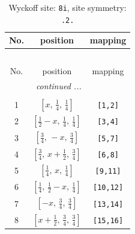 \documentclass[fleqn,8pt]{jsarticle}
\begin{document}
\begin{longtable}{ccc}
\caption{Wyckoff site: {\tt 8i}, site symmetry: {\tt .2.}}
 \\
 \hline \hline
No. & position & mapping \\ \hline \endfirsthead

\multicolumn{2}{l}{\tablename\ \thetable{}} \\
 \hline \hline
No. & position & mapping \\ \hline \endhead

 \hline \hline
\multicolumn{2}{r}{\footnotesize\it continued ...} \\ \endfoot

 \hline \hline
\multicolumn{2}{r}{} \\ \endlastfoot

1 & $\left[ x,\, \frac{1}{4},\, \frac{1}{4} \right]$ & {\tt [1,2]} \\ \hline
2 & $\left[ \frac{1}{2} - x,\, \frac{1}{4},\, \frac{1}{4} \right]$ & {\tt [3,4]} \\ \hline
3 & $\left[ \frac{3}{4},\, - x,\, \frac{3}{4} \right]$ & {\tt [5,7]} \\ \hline
4 & $\left[ \frac{3}{4},\, x + \frac{1}{2},\, \frac{3}{4} \right]$ & {\tt [6,8]} \\ \hline
5 & $\left[ \frac{1}{4},\, x,\, \frac{1}{4} \right]$ & {\tt [9,11]} \\ \hline
6 & $\left[ \frac{1}{4},\, \frac{1}{2} - x,\, \frac{1}{4} \right]$ & {\tt [10,12]} \\ \hline
7 & $\left[ - x,\, \frac{3}{4},\, \frac{3}{4} \right]$ & {\tt [13,14]} \\ \hline
8 & $\left[ x + \frac{1}{2},\, \frac{3}{4},\, \frac{3}{4} \right]$ & {\tt [15,16]} \\
\end{longtable}
\renewcommand{\arraystretch}{1.2}
\end{document}
